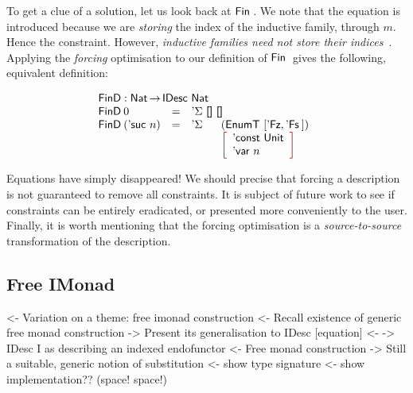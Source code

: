 To get a clue of a solution, let us look back at $\Fin$. We note that
the equation is introduced because we are \emph{storing} the index of
the inductive family, through $m$. Hence the constraint. However,
\emph{inductive families need not store their
  indices}~\cite{brady:index-inductive-families}. Applying the
\emph{forcing} optimisation to our definition of $\Fin$ gives the
following, equivalent definition:

\[\stk{
\FinD : \Nat \To \IDesc{\Nat} \\
\begin{array}{@{}llll}
\FinD\: 0            & = & \multicolumn{2}{l}{\DSigma{\Void}{\Void} } \\
\FinD\: (\NatSuc{n}) & = & \DSigma{}{} & (\EnumT{[ \FinZero , \FinSuc{} ]}) \\
                     &   &             & \bigRedBracket{
                                         \begin{array}{l}
                                         \DConst{\Unit} \\
                                         \DVar{n}
                                         \end{array}
                                         }
\end{array}
}\]

Equations have simply disappeared! We should precise that forcing a
description is not guaranteed to remove all constraints. It is subject
of future work to see if constraints can be entirely eradicated, or
presented more conveniently to the user. Finally, it is worth
mentioning that the forcing optimisation is a \emph{source-to-source}
transformation of the description.

\subsection{Free IMonad}

\begin{wstructure}
<- Variation on a theme: free imonad construction
    <- Recall existence of generic free monad construction
    -> Present its generalisation to IDesc [equation]
        <- \I -> IDesc I as describing an indexed endofunctor
        <- Free monad construction
    -> Still a suitable, generic notion of substitution
        <- show type signature
        <- show implementation?? (space! space!)
\end{wstructure}

